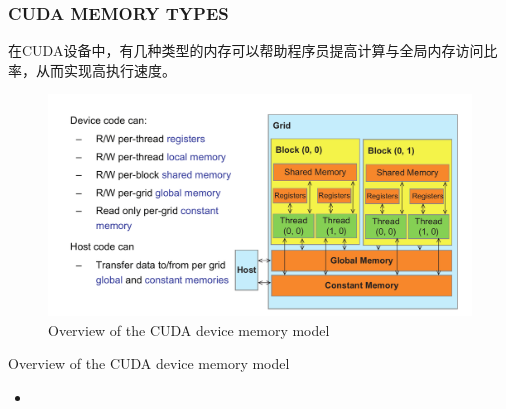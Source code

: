 \documentclass[11pt]{ctexart}
\begin{document}
\subsubsection{CUDA MEMORY TYPES}

在CUDA设备中，有几种类型的内存可以帮助程序员提高计算与全局内存访问比率，从而实现高执行速度。

\begin{figure}[ht]
	\centering
	\includegraphics[width=1.0\textwidth]{images/OverviewoftheCUDAdevicememorymodel.png}
	\caption{Overview of the CUDA device memory model}
	\label{fig:1}
\end{figure}

Overview of the CUDA device memory model

\begin{itemize}
	\item 
\end{itemize}
\end{document}
